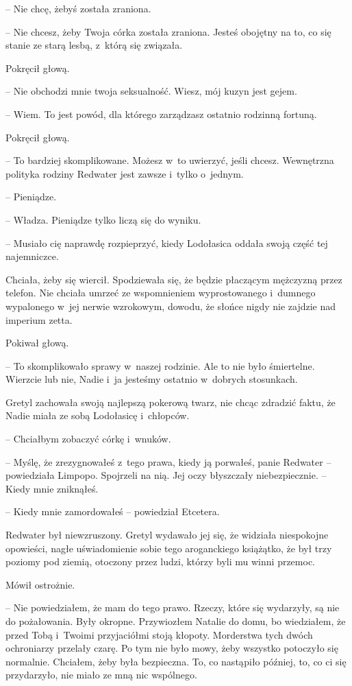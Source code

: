 \documentclass[oneside,polish,11pt,sfheadings]{mwbk}
\begin{document}
-- Nie chcę, żebyś została zraniona.

-- Nie chcesz, żeby Twoja córka została zraniona. Jesteś obojętny na to,
co się stanie ze starą lesbą, z~którą się związała.

Pokręcił głową. 

-- Nie obchodzi mnie twoja seksualność. Wiesz, mój kuzyn
jest gejem.

-- Wiem. To jest powód, dla którego zarządzasz ostatnio rodzinną fortuną.

Pokręcił głową. 

-- To bardziej skomplikowane. Możesz w~to uwierzyć, jeśli
chcesz. Wewnętrzna polityka rodziny Redwater jest zawsze i~tylko o~jednym.

-- Pieniądze.

-- Władza. Pieniądze tylko liczą się do wyniku.

-- Musiało cię naprawdę rozpieprzyć, kiedy Lodołasica oddała swoją część
tej najemniczce. 

Chciała, żeby się wiercił. Spodziewała się, że będzie
płaczącym mężczyzną przez telefon. Nie chciała umrzeć ze wspomnieniem
wyprostowanego i~dumnego wypalonego w~jej nerwie wzrokowym, dowodu, że
słońce nigdy nie zajdzie nad imperium zetta.

Pokiwał głową. 

-- To skomplikowało sprawy w~naszej rodzinie. Ale to nie
było śmiertelne. Wierzcie lub nie, Nadie i~ja jesteśmy ostatnio w~dobrych stosunkach.

Gretyl zachowała swoją najlepszą pokerową twarz, nie chcąc zdradzić
faktu, że Nadie miała ze sobą Lodołasicę i~chłopców.

-- Chciałbym zobaczyć córkę i~wnuków.

-- Myślę, że zrezygnowałeś z~tego prawa, kiedy ją porwałeś, panie
Redwater -- powiedziała Limpopo. Spojrzeli na nią. Jej oczy błyszczały
niebezpiecznie. -- Kiedy mnie zniknąłeś.

-- Kiedy mnie zamordowałeś -- powiedział Etcetera.

Redwater był niewzruszony. Gretyl wydawało jej się, że widziała
niespokojne opowieści, nagłe uświadomienie sobie tego aroganckiego
książątko, że był trzy poziomy pod ziemią, otoczony przez ludzi, którzy
byli mu winni przemoc.

Mówił ostrożnie. 

-- Nie powiedziałem, że mam do tego prawo. Rzeczy, które
się wydarzyły, są nie do pożałowania. Były okropne. Przywiozłem Natalie
do domu, bo wiedziałem, że przed Tobą i~Twoimi przyjaciółmi stoją
kłopoty. Morderstwa tych dwóch ochroniarzy przelały czarę. Po tym nie
było mowy, żeby wszystko potoczyło się normalnie. Chciałem, żeby była
bezpieczna. To, co nastąpiło później, to, co ci się przydarzyło, nie
miało ze mną nic wspólnego.
\end{document}
